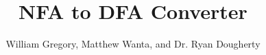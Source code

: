 

\title{\textbf{NFA to DFA Converter}}
\author{William Gregory, Matthew Wanta, and Dr. Ryan Dougherty}
\date{}
\maketitle
\thispagestyle{fancy}
